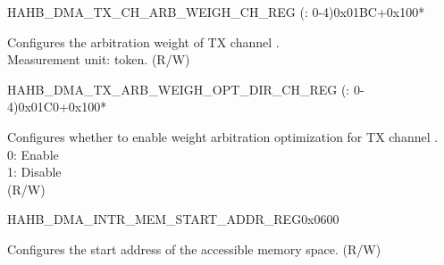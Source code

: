 \begin{register}{H}{AHB\_DMA\_TX\_CH\_ARB\_WEIGH\_CH\_REG (: 0-4)}{0x01BC+0x100*}\label{regdesc:AHBDMATXCHARBWEIGHCHNREG}
%
%
\regnewline%
\begin{regdesc}\begin{reglist}
\label{fielddesc:AHBDMATXCHARBWEIGHCHN}\item [AHB\_DMA\_TX\_CH\_ARB\_WEIGH\_CH\regindex{n}] Configures the arbitration weight of TX channel .\\Measurement unit: token. (R/W)
\end{reglist}\end{regdesc}
\end{register}


\begin{register}{H}{AHB\_DMA\_TX\_ARB\_WEIGH\_OPT\_DIR\_CH\_REG (: 0-4)}{0x01C0+0x100*}\label{regdesc:AHBDMATXARBWEIGHOPTDIRCHNREG}
%
%
\regnewline%
\begin{regdesc}\begin{reglist}
\label{fielddesc:AHBDMATXARBWEIGHOPTDIRCHN}\item [AHB\_DMA\_TX\_ARB\_WEIGH\_OPT\_DIR\_CH\regindex{n}] Configures whether to enable weight arbitration optimization for TX channel .\\
0: Enable\\
1: Disable\\ (R/W)
\end{reglist}\end{regdesc}
\end{register}


\begin{register}{H}{AHB\_DMA\_INTR\_MEM\_START\_ADDR\_REG}{0x0600}\label{regdesc:AHBDMAINTRMEMSTARTADDRREG}
%
\regnewline%
\begin{regdesc}\begin{reglist}
\label{fielddesc:AHBDMAACCESSINTRMEMSTARTADDR}\item [AHB\_DMA\_ACCESS\_INTR\_MEM\_START\_ADDR] Configures the start address of the accessible memory space. (R/W)
\end{reglist}\end{regdesc}
\end{register}



